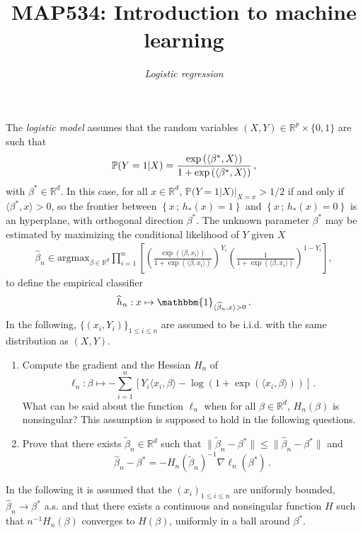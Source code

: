 \documentclass[a4paper,10pt,fleqn]{article}
\title{{\bf MAP534:  Introduction to machine learning}}
\author{{\em Logistic regression}}
\date{}
\newcommand{\eqsp}{\,}
\newcommand{\rset}{\ensuremath{\mathbb{R}}}
\newcommand{\bP}{\mathbb{P}}
\newcommand{\1}{\ensuremath{\mathbbm{1}}}
\begin{document}
\maketitle


The \emph{logistic model} assumes that the random variables  $(X,Y)\in \rset^p\times\{0,1\}$ are such that
$$
\bP(Y=1|X)={\exp\left(\langle \beta^*,X\rangle\right)\over 1+\exp\left(\langle \beta^*,X\rangle\right)}\eqsp,
$$
with $\beta^*\in\mathbb{R}^d$. In this case, for all $x\in\rset^d$, $\bP(Y=1|X)|_{X=x}>1/2$ if and only if $\langle \beta^*,x\rangle>0$, so
the frontier between $\left\{x\eqsp;\eqsp h_{*}(x)=1\right\}$ and $\left\{x\eqsp ;\eqsp h_{*}(x)=0\right\}$ is an hyperplane, with orthogonal
direction $\beta^*$. The unknown parameter $\beta^*$ may be estimated  by maximizing the conditional likelihood of $Y$ given $X$
\begin{align*}
\widehat \beta_n\in\mathrm{argmax}_{\beta\in\mathbb{R}^{d}}
\prod_{i=1}^n \left[ \left( \frac{\exp\left(\langle
	\beta,x_{i}\rangle\right)}{1+\exp\left(\langle
	\beta,x_{i}\rangle\right)}\right)^{Y_{i}}
\left(\frac{1}{1+\exp\left(\langle
	\beta,x_{i}\rangle\right)}\right)^{1- Y_{i}} \right] ,
\end{align*}
to define the empirical classifier
$$
\widehat h_{n}: x \mapsto \1_{\langle \widehat\beta_n,x\rangle>0}\eqsp.
$$
In the following, $\{(x_i,Y_i)\}_{1\leqslant i\leqslant n}$ are assumed to be i.i.d. with the same distribution as $(X,Y)$.
\begin{enumerate}
\item Compute the gradient and the Hessian $H_{n}$ of
$$
\ell_{n}:\beta \mapsto -\sum_{i=1}^n\left[Y_{i}\langle x_{i},\beta\rangle-\log(1+\exp(\langle x_{i},\beta\rangle))\right]\eqsp.
$$
What can be said about the function $\ell_{n}$ when for all $\beta\in\rset^d$, $H_{n}(\beta)$ is nonsingular? This assumption is supposed to hold in the following questions.
\item Prove that there exists $\widetilde \beta_n\in\rset^d$ such that $\|\widetilde \beta_n-\beta^*\|\leq \|\widehat \beta_n-\beta^*\|$ and
$$
\widehat \beta_n-\beta^*=-H_{n}(\widetilde \beta_n)^{-1}\nabla \ell_{n}(\beta^*)\eqsp.
$$
\end{enumerate}
In the following it is assumed that the $(x_{i})_{1\leqslant i\leqslant n}$ are uniformly bounded, $\widehat \beta_n\to \beta^*$ a.s. and that there exists a continuous and nonsingular function $H$ such that $n^{-1}H_{n}(\beta)$ converges to $H(\beta)$, uniformly in a ball around $\beta^*$.
\end{document}
